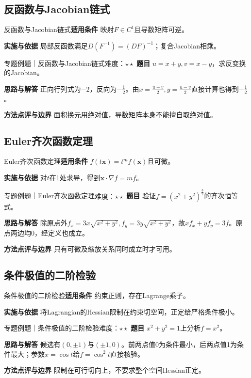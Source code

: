 \subsection{反函数与Jacobian链式}\label{mat:multivariable:jacobian}
\begin{method}{反函数与Jacobian链式}\textbf{适用条件} 映射$F\in C^1$且导数矩阵可逆。\par\textbf{实施与依据} 局部反函数满足$D(F^{-1})=(DF)^{-1}$；复合Jacobian相乘。\end{method}
\begin{example}{专题例题｜反函数与Jacobian链式}{难度：$\star\star$}
\textbf{题目} $u=x+y,v=x-y$，求反变换的Jacobian。\par\textbf{思路与解答} 正向行列式为$-2$，反向为$-\frac{1}{2}$。由$x=\frac{u+v}{2},y=\frac{u-v}{2}$直接计算也得到$-\frac{1}{2}$。\par\textbf{方法点评与边界} 面积换元用绝对值，导数矩阵本身不能擅自取绝对值。
\end{example}
\subsection{Euler齐次函数定理}\label{mat:multivariable:homogeneous}
\begin{method}{Euler齐次函数定理}\textbf{适用条件} $f(t\bm x)=t^mf(\bm x)$且可微。\par\textbf{实施与依据} 对$t$在1处求导，得到$\bm x\cdot\nabla f=mf$。\end{method}
\begin{example}{专题例题｜Euler齐次函数定理}{难度：$\star\star$}
\textbf{题目} 验证$f=(x^2+y^2)^{\frac{3}{2}}$的齐次恒等式。\par\textbf{思路与解答} 除原点外$f_x=3x\sqrt{x^2+y^2},f_y=3y\sqrt{x^2+y^2}$，故$xf_x+yf_y=3f$。原点两边均0，经定义也成立。\par\textbf{方法点评与边界} 只有可微及缩放关系同时成立时才可用。
\end{example}
\subsection{条件极值的二阶检验}\label{mat:multivariable:constrained2}
\begin{method}{条件极值的二阶检验}\textbf{适用条件} 约束正则，存在Lagrange乘子。\par\textbf{实施与依据} 将Lagrangian的Hessian限制在约束切空间，正定给严格条件极小。\end{method}
\begin{example}{专题例题｜条件极值的二阶检验}{难度：$\star\star$}
\textbf{题目} $x^2+y^2=1$上分析$f=x^2$。\par\textbf{思路与解答} 候选有$(0,\pm1)$与$(\pm1,0)$。前两点值0为条件最小，后两点值1为条件最大；参数$x=\cos t$给$f=\cos^2t$直接核验。\par\textbf{方法点评与边界} 限制在可行切向上，不要求整个空间Hessian正定。
\end{example}
